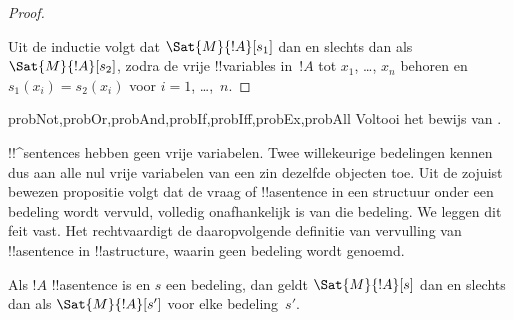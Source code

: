 \documentclass[openany]{memoir}
\begin{document}
\begin{proof}
\begin{enumerate}
\end{enumerate}
Uit de inductie volgt dat $\Sat{M}{!A}[s_1]$ dan en slechts dan als
$\Sat{M}{!A}[s_2]$, zodra de vrije !!{variable}s in~$!A$ tot
$x_1$, \dots, $x_n$ behoren en $s_1(x_i)=s_2(x_i)$ voor
$i = 1$, \dots,~$n$.
\end{proof}

\begin{probtag}{probNot,probOr,probAnd,probIf,probIff,probEx,probAll}
Voltooi het bewijs van .
\end{probtag}

\begin{explain}
!!^{sentence}s hebben geen vrije variabelen. Twee willekeurige
bedelingen kennen dus aan alle nul vrije variabelen van een zin
dezelfde objecten toe. Uit de zojuist bewezen propositie volgt dat de
vraag of !!a{sentence} in een structuur onder een bedeling wordt
vervuld, volledig onafhankelijk is van die bedeling. We leggen dit
feit vast. Het rechtvaardigt de daaropvolgende definitie van vervulling
van !!a{sentence} in !!a{structure}, waarin geen bedeling wordt genoemd.
\end{explain}

\begin{cor}
Als $!A$ !!a{sentence} is en $s$ een bedeling, dan geldt
$\Sat{M}{!A}[s]$ dan en slechts dan als $\Sat{M}{!A}[s']$ voor elke
bedeling~$s'$.
\end{cor}
\end{document}
